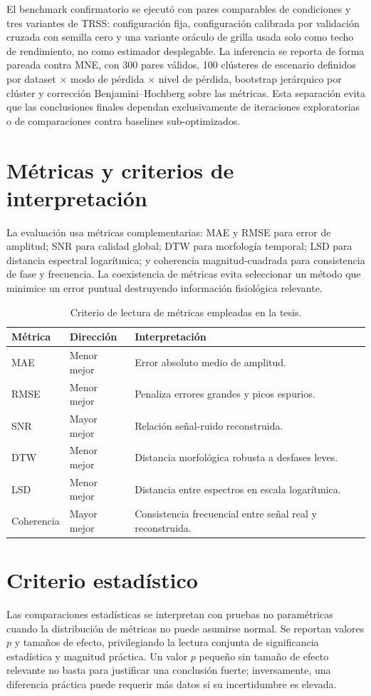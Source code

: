 El benchmark confirmatorio se ejecutó con pares comparables de condiciones y tres variantes de TRSS: configuración fija, configuración calibrada por validación cruzada con semilla cero y una variante oráculo de grilla usada solo como techo de rendimiento, no como estimador desplegable. La inferencia se reporta de forma pareada contra MNE, con 300 pares válidos, 100 clústeres de escenario definidos por dataset $\times$ modo de pérdida $\times$ nivel de pérdida, bootstrap jerárquico por clúster y corrección Benjamini--Hochberg sobre las métricas. Esta separación evita que las conclusiones finales dependan exclusivamente de iteraciones exploratorias o de comparaciones contra baselines sub-optimizados.

\section{Métricas y criterios de interpretación}
La evaluación usa métricas complementarias: MAE y RMSE para error de amplitud; SNR para calidad global; DTW para morfología temporal; LSD para distancia espectral logarítmica; y coherencia magnitud-cuadrada para consistencia de fase y frecuencia. La coexistencia de métricas evita seleccionar un método que minimice un error puntual destruyendo información fisiológica relevante.

\begin{table}[H]
\centering
\caption{Criterio de lectura de métricas empleadas en la tesis.}
\label{tab:metric_reading}
\begin{tabular}{p{}p{}p{}}
\toprule
Métrica & Dirección & Interpretación \\
\midrule
MAE & Menor mejor & Error absoluto medio de amplitud. \\
RMSE & Menor mejor & Penaliza errores grandes y picos espurios. \\
SNR & Mayor mejor & Relación señal-ruido reconstruida. \\
DTW & Menor mejor & Distancia morfológica robusta a desfases leves. \\
LSD & Menor mejor & Distancia entre espectros en escala logarítmica. \\
Coherencia & Mayor mejor & Consistencia frecuencial entre señal real y reconstruida. \\
\bottomrule
\end{tabular}
\end{table}

\section{Criterio estadístico}
Las comparaciones estadísticas se interpretan con pruebas no paramétricas cuando la distribución de métricas no puede asumirse normal. Se reportan valores $p$ y tamaños de efecto, privilegiando la lectura conjunta de significancia estadística y magnitud práctica. Un valor $p$ pequeño sin tamaño de efecto relevante no basta para justificar una conclusión fuerte; inversamente, una diferencia práctica puede requerir más datos si su incertidumbre es elevada.
